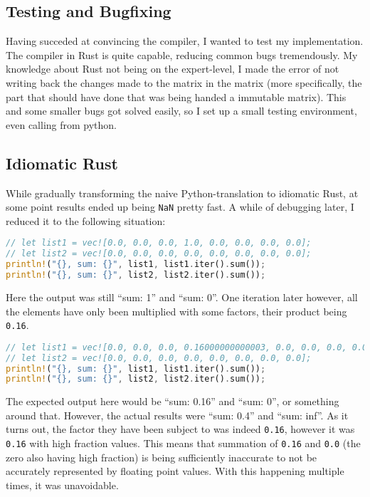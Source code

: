 \subsection{Testing and Bugfixing}


Having succeded at convincing the compiler, I wanted to test my implementation.
The compiler in Rust is quite capable, reducing common bugs tremendously.
My knowledge about Rust not being on the expert-level, I made the error of not
writing back the changes made to the matrix in the matrix (more specifically,
the part that should have done that was being handed a immutable matrix). This
and some smaller bugs got solved easily, so I set up a small testing
environment, even calling from python.


\subsection{Idiomatic Rust}


While gradually transforming the naive Python-translation to idiomatic Rust, at
some point results ended up being \verb|NaN| pretty fast. A while of
debugging later, I reduced it to the following situation:

\vline
\begin{lstlisting}[language=Rust]
// let list1 = vec![0.0, 0.0, 0.0, 1.0, 0.0, 0.0, 0.0, 0.0];
// let list2 = vec![0.0, 0.0, 0.0, 0.0, 0.0, 0.0, 0.0, 0.0];
println!("{}, sum: {}", list1, list1.iter().sum());
println!("{}, sum: {}", list2, list2.iter().sum());
\end{lstlisting}
\vline

Here the output was still ``sum: 1'' and ``sum: 0''. One iteration later however, all the elements have only been multiplied with some factors, their product being \verb|0.16|.

\vline
\begin{lstlisting}[language=Rust]
// let list1 = vec![0.0, 0.0, 0.0, 0.16000000000003, 0.0, 0.0, 0.0, 0.0];
// let list2 = vec![0.0, 0.0, 0.0, 0.0, 0.0, 0.0, 0.0, 0.0];
println!("{}, sum: {}", list1, list1.iter().sum());
println!("{}, sum: {}", list2, list2.iter().sum());
\end{lstlisting}
\vline

The expected output here would be ``sum: 0.16'' and ``sum: 0'', or something
around that. However, the actual results were ``sum: 0.4'' and ``sum: inf''. As
it turns out, the factor they have been subject to was indeed \verb|0.16|,
however it was \verb|0.16| with high fraction values. This means that summation
of \verb|0.16| and \verb|0.0| (the zero also having high fraction) is being
sufficiently inaccurate to not be accurately represented by floating point
values. With this happening multiple times, it was unavoidable.

